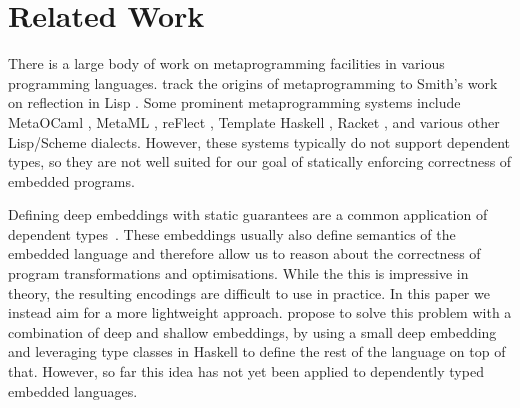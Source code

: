 \documentclass[sigplan,screen]{acmart}
\renewcommand\paragraph{\noindentparagraph}
\begin{document}





\section{\label{sec:related}Related Work}

There is a large body of
work on metaprogramming facilities in various programming
languages.  \citet{refl-masses} track the origins
of metaprogramming to Smith's work on reflection in Lisp \cite{refl-lisp}.
Some prominent metaprogramming systems include
MetaOCaml \cite{metaocaml}, Me\-taML \cite{metaml},
reFlect \cite{DBLP:journals/jfp/GrundyMO06},
Template Haskell \cite{sheard2002template},
Racket \cite{plt-tr1}, and various other Lisp/Scheme dialects.
%
However, these systems typically do not support dependent
types, so they are not well suited for our goal of statically
enforcing correctness of embedded programs.

Defining deep embeddings with static guarantees are a common application
of dependent types~\cite{10.5555/647849.737066,CHAPMAN200921,
10.1007/978-3-540-74464-1_7,10.1145/3236785,10.1145/1863495.1863497}.
%
These embeddings usually also define semantics of the embedded
language and therefore allow us to reason about the correctness
of program transformations and optimisations.
%
While the this is impressive in theory, the resulting
encodings are difficult to use in practice. In this paper
we instead aim for a more lightweight approach.
%
\citet{deepshallow} propose to solve this problem with
a combination of deep and shallow embeddings, by using
a small deep embedding and leveraging type classes in Haskell to define
the rest of the language on top of that.  However, so far this idea has not yet
been applied to dependently typed embedded languages.
\end{document}

